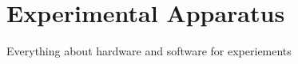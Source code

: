 
\chapter{Experimental Apparatus}
\label{chp:experimental_apparatus}

Everything about hardware and software for experiements
